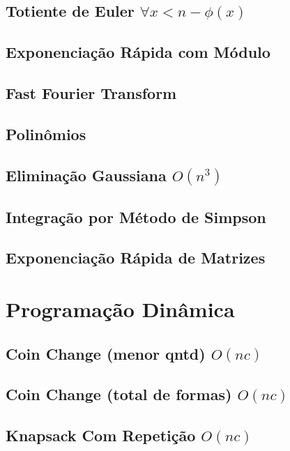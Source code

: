 \documentclass[10pt, letterpaper, twocolumn, twosides]{article}
\begin{document}
\subsection{Totiente de Euler ${\forall x < n - \phi(x)}$}

\subsection{Exponenciação Rápida com Módulo}

\subsection{Fast Fourier Transform}

\subsection{Polinômios}

\subsection{Eliminação Gaussiana ${O(n^3)}$}

\subsection{Integração por Método de Simpson}

\subsection{Exponenciação Rápida de Matrizes}


\section{Programação Dinâmica}
\subsection{Coin Change (menor qntd) ${O(nc)}$}

\subsection{Coin Change (total de formas) ${O(nc)}$}

\subsection{Knapsack Com Repetição ${O(nc)}$}

\end{document}
